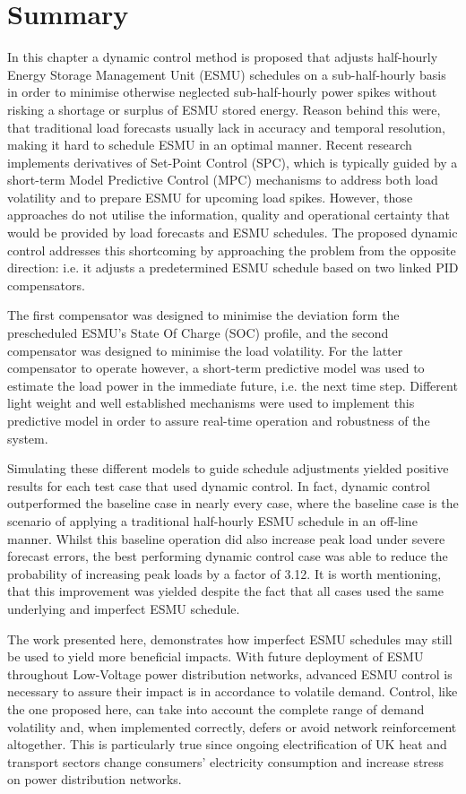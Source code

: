 \section{Summary}
\label{ch2:sec:summary}

In this chapter a dynamic control method is proposed that adjusts half-hourly Energy Storage Management Unit (ESMU) schedules on a sub-half-hourly basis in order to minimise otherwise neglected sub-half-hourly power spikes without risking a shortage or surplus of ESMU stored energy.
Reason behind this were, that traditional load forecasts usually lack in accuracy and temporal resolution, making it hard to schedule ESMU in an optimal manner.
Recent research implements derivatives of Set-Point Control (SPC), which is typically guided by a short-term Model Predictive Control (MPC) mechanisms to address both load volatility and to prepare ESMU for upcoming load spikes.
However, those approaches do not utilise the information, quality and operational certainty that would be provided by load forecasts and ESMU schedules.
The proposed dynamic control addresses this shortcoming by approaching the problem from the opposite direction: i.e. it adjusts a predetermined ESMU schedule based on two linked PID compensators.

The first compensator was designed to minimise the deviation form the prescheduled ESMU's State Of Charge (SOC) profile, and the second compensator was designed to minimise the load volatility.
For the latter compensator to operate however, a short-term predictive model was used to estimate the load power in the immediate future, i.e. the next time step.
Different light weight and well established mechanisms were used to implement this predictive model in order to assure real-time operation and robustness of the system.

Simulating these different models to guide schedule adjustments yielded positive results for each test case that used dynamic control.
In fact, dynamic control outperformed the baseline case in nearly every case, where the baseline case is the scenario of applying a traditional half-hourly ESMU schedule in an off-line manner.
Whilst this baseline operation did also increase peak load under severe forecast errors, the best performing dynamic control case was able to reduce the probability of increasing peak loads by a factor of 3.12.
It is worth mentioning, that this improvement was yielded despite the fact that all cases used the same underlying and imperfect ESMU schedule.

The work presented here, demonstrates how imperfect ESMU schedules may still be used to yield more beneficial impacts.
With future deployment of ESMU throughout Low-Voltage power distribution networks, advanced ESMU control is necessary to assure their impact is in accordance to volatile demand.
Control, like the one proposed here, can take into account the complete range of demand volatility and, when implemented correctly, defers or avoid network reinforcement altogether.
This is particularly true since ongoing electrification of UK heat and transport sectors change consumers' electricity consumption and increase stress on power distribution networks.